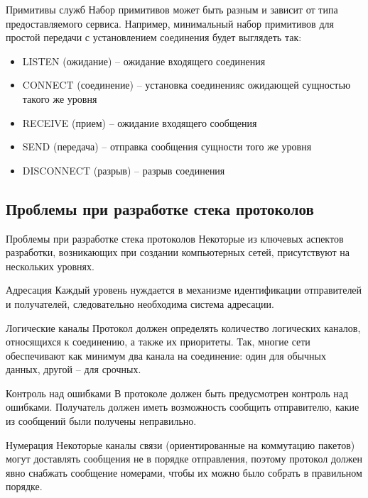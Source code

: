 \begin{frame}{Примитивы служб}
	Набор примитивов может быть разным и зависит от типа предоставляемого сервиса. Например,  минимальный набор примитивов для простой передачи с установлением соединения будет выглядеть так:
	\begin{itemize}
		\item LISTEN (ожидание) -- ожидание входящего соединения
		\item CONNECT (соединение) -- установка соединенияс ожидающей сущностью такого же уровня
		\item RECEIVE (прием) -- ожидание входящего сообщения
		\item SEND (передача) -- отправка сообщения сущности того же уровня
		\item DISCONNECT (разрыв) -- разрыв соединения
	\end{itemize}
\end{frame}


\subsection{Проблемы при разработке стека протоколов}
\begin{frame}{Проблемы при разработке стека протоколов}
	Некоторые из ключевых аспектов разработки,  возникающих при создании компьютерных сетей,  присутствуют на нескольких уровнях.
\end{frame}

\begin{frame}{Адресация}
	Каждый уровень нуждается в механизме идентификации отправителей и получателей,  следовательно необходима система адресации.
\end{frame}

\begin{frame}{Логические каналы}
	Протокол должен определять количество логических каналов,  относящихся к соединению,  а также их приоритеты. Так,  многие сети обеспечивают как минимум два канала на соединение: один для обычных данных,  другой – для срочных.
\end{frame}

\begin{frame}{Контроль над ошибками}
	В протоколе должен быть предусмотрен контроль над ошибками. Получатель должен иметь возможность сообщить отправителю,  какие из сообщений были получены неправильно.
\end{frame}

\begin{frame}{Нумерация}
	Некоторые каналы связи (ориентированные на коммутацию пакетов) могут доставлять сообщения не в порядке отправления,  поэтому протокол должен явно снабжать сообщение номерами,  чтобы их можно было собрать в правильном порядке.
\end{frame}

